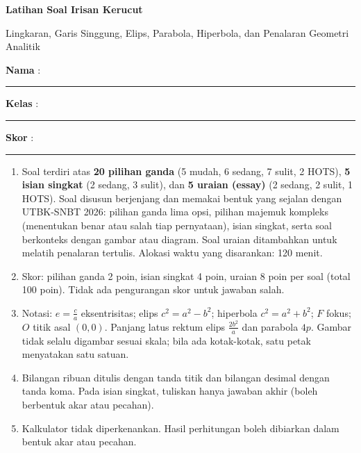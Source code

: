 \documentclass[a4paper,11pt]{article}
\newcounter{no}
\begin{document}
\thispagestyle{fancy}

\begin{center}
  {\color{mainc}\fontsize{22}{26}\selectfont\bfseries Latihan Soal Irisan Kerucut\par}
  \vspace{2pt}
  {\color{accc}\large Lingkaran, Garis Singgung, Elips, Parabola, Hiperbola, dan Penalaran Geometri Analitik\par}
\end{center}
\vspace{2pt}
\begin{tcolorbox}[colback=softbg,colframe=mainc!40,boxrule=0.6pt,arc=3pt,left=8pt,right=8pt,top=5pt,bottom=5pt]
\noindent\textbf{Nama} : \rule{4.6cm}{0.4pt}\hfill\textbf{Kelas} : \rule{2.2cm}{0.4pt}\hfill\textbf{Skor} : \rule{2.2cm}{0.4pt}
\end{tcolorbox}
\vspace{2pt}
\begin{tcolorbox}[colback=white,colframe=accc,boxrule=0.8pt,arc=3pt,left=8pt,right=8pt,top=4pt,bottom=4pt,title={\bfseries Petunjuk Pengerjaan},coltitle=white,fonttitle=\small]
\small
\begin{enumerate}[leftmargin=1.4em,itemsep=1pt,topsep=1pt]
\item Soal terdiri atas \textbf{20 pilihan ganda} (5 mudah, 6 sedang, 7 sulit, 2 HOTS), \textbf{5 isian singkat} (2 sedang, 3 sulit), dan \textbf{5 uraian (essay)} (2 sedang, 2 sulit, 1 HOTS). Soal disusun berjenjang dan memakai bentuk yang sejalan dengan UTBK-SNBT 2026: pilihan ganda lima opsi, pilihan majemuk kompleks (menentukan benar atau salah tiap pernyataan), isian singkat, serta soal berkonteks dengan gambar atau diagram. Soal uraian ditambahkan untuk melatih penalaran tertulis. Alokasi waktu yang disarankan: 120 menit.
\item Skor: pilihan ganda 2 poin, isian singkat 4 poin, uraian 8 poin per soal (total 100 poin). Tidak ada pengurangan skor untuk jawaban salah.
\item Notasi: $e=\frac ca$ eksentrisitas; elips $c^2=a^2-b^2$; hiperbola $c^2=a^2+b^2$; $F$ fokus; $O$ titik asal $(0,0)$. Panjang latus rektum elips $\frac{2b^2}{a}$ dan parabola $4p$. Gambar tidak selalu digambar sesuai skala; bila ada kotak-kotak, satu petak menyatakan satu satuan.
\item Bilangan ribuan ditulis dengan tanda titik dan bilangan desimal dengan tanda koma. Pada isian singkat, tuliskan hanya jawaban akhir (boleh berbentuk akar atau pecahan).
\item Kalkulator tidak diperkenankan. Hasil perhitungan boleh dibiarkan dalam bentuk akar atau pecahan.
\end{enumerate}
\end{tcolorbox}
\end{document}
